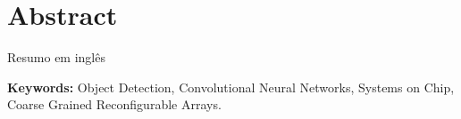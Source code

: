 
\section*{Abstract}



Resumo em inglês

\vfill

\textbf{\Large Keywords:} Object Detection, Convolutional Neural Networks,
Systems on Chip, Coarse Grained Reconfigurable Arrays.

